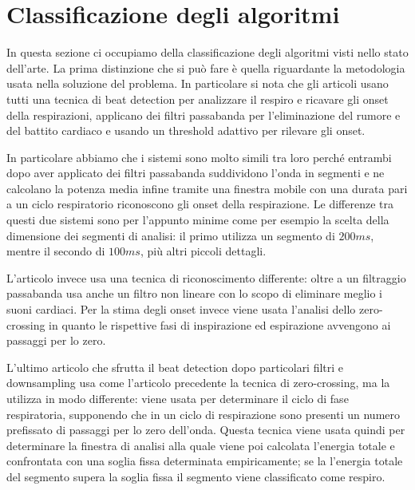 \section{Classificazione degli algoritmi}%

  In questa sezione ci occupiamo della classificazione degli algoritmi visti nello stato dell'arte. 
  La prima distinzione che si pu\`o fare \`e quella riguardante la metodologia usata nella soluzione del problema. In particolare si nota che gli articoli \cite{ASPODUOCSS} \cite{CARPDWAM} \cite{DECE} \cite{ASTFARA} usano tutti una tecnica di beat detection per analizzare il respiro e ricavare gli onset della respirazioni, applicano dei filtri passabanda per l'eliminazione del rumore e del battito cardiaco e usando un threshold adattivo per rilevare gli onset.
  
  
  In particolare abbiamo che i sistemi \cite{CARPDWAM} \cite{DECE} sono molto simili tra loro perch\'e entrambi dopo aver applicato dei filtri passabanda suddividono l'onda in segmenti e ne calcolano la potenza media infine tramite una finestra mobile con una durata pari a un ciclo respiratorio riconoscono gli onset della respirazione.
  Le differenze tra questi due sistemi sono per l'appunto minime come per esempio la scelta della dimensione dei segmenti di analisi: il primo utilizza un segmento di $200 ms$, mentre il secondo di $100 ms$, pi\`u altri piccoli dettagli.
  

  L'articolo \cite{ASPODUOCSS} invece usa una tecnica di riconoscimento differente:
  oltre a un filtraggio passabanda usa anche un filtro non lineare con lo scopo di eliminare meglio i suoni cardiaci.
  Per la stima degli onset invece viene usata l'analisi dello zero-crossing in quanto le rispettive fasi di inspirazione ed espirazione avvengono ai passaggi per lo zero.


  L'ultimo articolo che sfrutta il beat detection \cite{ASTFARA} dopo particolari filtri e downsampling usa come l'articolo precedente la tecnica di zero-crossing, ma la utilizza in modo differente: viene usata per determinare il ciclo di fase respiratoria, supponendo che in un ciclo di respirazione sono presenti un numero prefissato di passaggi per lo zero dell'onda.
  Questa tecnica viene usata quindi per determinare la finestra di analisi alla quale viene poi calcolata l'energia totale e confrontata con una soglia fissa determinata empiricamente; se la l'energia totale del segmento supera la soglia fissa il segmento viene classificato come respiro. 


